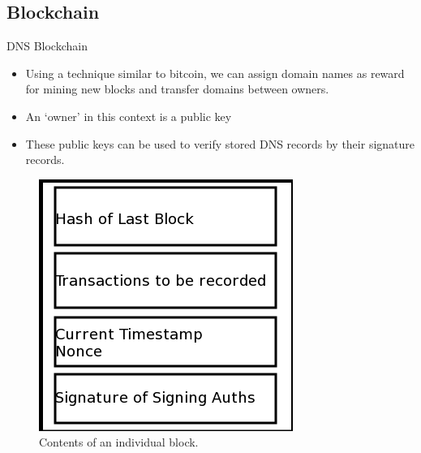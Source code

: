 \documentclass[11pt]{beamer}
\begin{document}
\subsection{Blockchain}

\begin{frame}{DNS Blockchain}
	\begin{itemize}
		\item Using a technique similar to bitcoin, we can assign domain names as reward for mining new blocks and transfer domains between owners.
		
		\item An `owner' in this context is a public key
		
		\item These public keys can be used to verify stored DNS records by their signature records.
	\end{itemize}
\end{frame}



\begin{frame}
	\begin{figure}
	\centering
	\includegraphics[width=0.4\linewidth]{namecoin_block}
	\caption{Contents of an individual block.}
	\label{fig:blockchain}
	\end{figure}

\end{frame}
\end{document}
